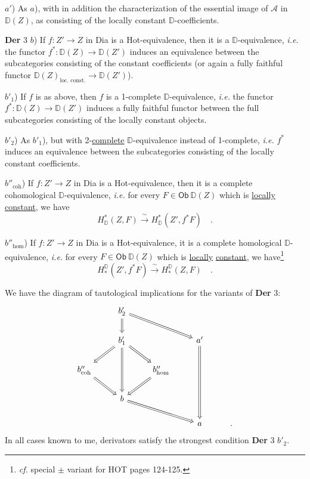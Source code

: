\documentclass[11pt]{article}
\newcommand{\printedpage}[1]{\marginpar{\footnotesize p.~#1}}
\newcommand{\msp}[1]{\marginpar{\footnotesize [#1]}}
\newcommand{\HOT}{\textsf{HOT}}
\newcommand{\Hot}{\textsf{Hot}}
\newcommand{\Dia}{\textsf{Dia}}
\newcommand{\DD}{\mathbb{D}}
\begin{document}
$a'$) As $a$), with in addition the characterization of the essential image of $\mathcal{A}$ in $\DD(Z)$, as consisting of the locally constant $\DD$-coefficients. %

\textbf{Der} 3 $b$) If $f : Z' \to Z$ in \Dia{} is a \Hot-equivalence, then it is a $\DD$-equivalence, \textit{i.e.} the functor $f^{*} : \DD(Z) \to \DD(Z')$ induces an equivalence between the subcategories consisting of the constant coefficients (or again a fully faithful functor $\DD(Z)_{\text{loc. const.}} \longrightarrow \DD(Z')$).

$b'_1$) If $f$ is as above, then $f$ is a 1-complete $\DD$-equivalence, \textit{i.e.} the functor $f^{*} : \DD(Z) \to \DD(Z')$ induces a fully faithful functor
\msp{page 112}
between the full subcategories consisting of the locally constant objects.

$b'_2$) As $b'_1$), but with 2-\underline{complete} $\DD$-equivalence instead of 1-complete, \textit{i.e.} $f^{*}$ induces an equivalence between the subcategories consisting of the locally constant coefficients.

$b''_{\mathrm{coh}}$) If $f : Z' \to Z$ in \Dia{} is a \Hot-equivalence, then it is a complete cohomological $\DD$-equivalence, \textit{i.e.} for every $F \in \mathsf{Ob}\ \DD(Z)$ which is \underline{locally} \underline{constant}, we have
\[ H^{*}_{\DD}(Z,F) \xrightarrow{\ \sim\ } H^{*}_{\DD}(Z',f^{*}F) \quad . \]

$b''_{\mathrm{hom}}$) If $f : Z' \to Z$ in \Dia{} is a \Hot-equivalence, it is a complete homological $\DD$-equivalence, \textit{i.e.} for every $F \in \mathsf{Ob}\ \DD(Z)$ which is \underline{locally} \underline{constant}, we have\footnote[59]{\textit{cf.} special $\pm$ variant for \HOT{} pages 124-125.}
\[ H_{*}^{\DD}(Z',f^{*}F) \xrightarrow{\ \sim\ } H_{*}^{\DD}(Z,F) \quad . \]

\printedpage{67}

We have the diagram of tautological implications for the variants of \textbf{Der} 3:
\[
\begin{tikzcd}
 & b'_2 \arrow[d, Rightarrow] \arrow[drr, Rightarrow] & & & \\
 & b'_1 \arrow[dl, Rightarrow] \arrow[dr, Rightarrow] \arrow[dd, Rightarrow] & & a' \arrow[ddd, Rightarrow] & \\
b''_{\mathrm{coh}} \arrow[dr, Rightarrow] & & b''_{\mathrm{hom}} \arrow[dl, Rightarrow] & & \\
 & b \arrow[drr, Rightarrow] & & & \\
 & & & a & .
\end{tikzcd}
\]
In all cases known to me, derivators satisfy the strongest condition \textbf{Der} 3 $b'_2$.
\msp{page 113}
\end{document}

